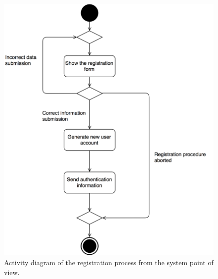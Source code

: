 \begin{figure}[H]
\begin{center}
		\includegraphics[width=\textwidth]{./specific_requirements/features/diagrams/registration_activity.png}
		\caption{Activity diagram of the registration process from the system point of view.}
		\label{register_act}
\end{center}
\end{figure}

